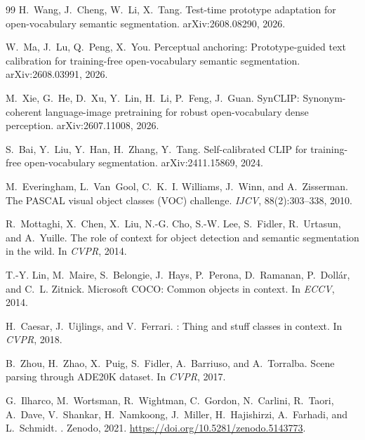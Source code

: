 \documentclass[11pt]{article}
\begin{document}
\begin{thebibliography}{99}
H.~Wang, J.~Cheng, W.~Li, X.~Tang.
\newblock Test-time prototype adaptation for open-vocabulary semantic
  segmentation.
\newblock arXiv:2608.08290, 2026.

W.~Ma, J.~Lu, Q.~Peng, X.~You.
\newblock Perceptual anchoring: Prototype-guided text calibration for
  training-free open-vocabulary semantic segmentation.
\newblock arXiv:2608.03991, 2026.

M.~Xie, G.~He, D.~Xu, Y.~Lin, H.~Li, P.~Feng, J.~Guan.
\newblock SynCLIP: Synonym-coherent language-image pretraining for robust
  open-vocabulary dense perception.
\newblock arXiv:2607.11008, 2026.

S.~Bai, Y.~Liu, Y.~Han, H.~Zhang, Y.~Tang.
\newblock Self-calibrated CLIP for training-free open-vocabulary
  segmentation.
\newblock arXiv:2411.15869, 2024.

M.~Everingham, L.~Van~Gool, C.~K.~I. Williams, J.~Winn, and A.~Zisserman.
\newblock The {PASCAL} visual object classes ({VOC}) challenge.
\newblock \emph{IJCV}, 88(2):303--338, 2010.

R.~Mottaghi, X.~Chen, X.~Liu, N.-G. Cho, S.-W. Lee, S.~Fidler, R.~Urtasun, and
  A.~Yuille.
\newblock The role of context for object detection and semantic segmentation
  in the wild.
\newblock In \emph{CVPR}, 2014.

T.-Y. Lin, M.~Maire, S.~Belongie, J.~Hays, P.~Perona, D.~Ramanan,
  P.~Doll\'ar, and C.~L. Zitnick.
\newblock Microsoft {COCO}: Common objects in context.
\newblock In \emph{ECCV}, 2014.

H.~Caesar, J.~Uijlings, and V.~Ferrari.
: Thing and stuff classes in context.
\newblock In \emph{CVPR}, 2018.

B.~Zhou, H.~Zhao, X.~Puig, S.~Fidler, A.~Barriuso, and A.~Torralba.
\newblock Scene parsing through {ADE20K} dataset.
\newblock In \emph{CVPR}, 2017.

G.~Ilharco, M.~Wortsman, R.~Wightman, C.~Gordon, N.~Carlini, R.~Taori,
  A.~Dave, V.~Shankar, H.~Namkoong, J.~Miller, H.~Hajishirzi, A.~Farhadi, and
  L.~Schmidt.
.
\newblock Zenodo, 2021. \url{https://doi.org/10.5281/zenodo.5143773}.


\end{thebibliography}
\end{document}
